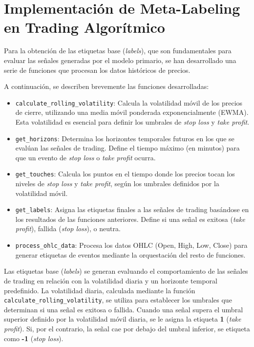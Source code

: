 \documentclass[a4paper,12pt, twoside]{report}
\begin{document}
\section{Implementación de Meta-Labeling en Trading Algorítmico}

Para la obtención de las etiquetas base (\textit{labels}), que 
son fundamentales para evaluar las señales generadas por el modelo primario, se han 
desarrollado una serie de funciones que procesan los datos históricos de precios.

A continuación, se describen brevemente las funciones desarrolladas:

\begin{itemize}
    
    \item \texttt{calculate\_rolling\_volatility}: Calcula la volatilidad móvil de 
    los precios de cierre, utilizando una media móvil ponderada exponencialmente (EWMA). 
    Esta volatilidad es esencial para definir los umbrales de \textit{stop loss} y 
    \textit{take profit}.
    
    \item \texttt{get\_horizons}: Determina los horizontes temporales futuros en 
    los que se evalúan las señales de trading. Define el tiempo máximo (en minutos) 
    para que un evento de \textit{stop loss} o \textit{take profit} ocurra.
    
    \item \texttt{get\_touches}: Calcula los puntos en el tiempo donde los precios 
    tocan los niveles de \textit{stop loss} y \textit{take profit}, según los 
    umbrales definidos por la volatilidad móvil.
    
    \item \texttt{get\_labels}: Asigna las etiquetas finales a las señales de 
    trading basándose en los resultados de las funciones anteriores. Define si 
    una señal es exitosa (\textit{take profit}), fallida (\textit{stop loss}), 
    o neutra.

    \item \texttt{process\_ohlc\_data}: Procesa los datos OHLC (Open, High, Low, 
    Close) para generar etiquetas de eventos mediante la orquestación del resto 
    de funciones.
    
\end{itemize}


Las etiquetas base (\textit{labels}) se generan evaluando el comportamiento de las 
señales de trading en relación con la volatilidad diaria y un horizonte temporal 
predefinido. La volatilidad diaria, calculada mediante la función 
\texttt{calculate\_rolling\_volatility}, se utiliza para establecer los umbrales 
que determinan si una señal es exitosa o fallida. Cuando una señal supera el 
umbral superior definido por la volatilidad móvil diaria, se le asigna la 
etiqueta \textbf{1} (\textit{take profit}). Si, por el contrario, la señal cae 
por debajo del umbral inferior, se etiqueta como \textbf{-1} (\textit{stop loss}).
\end{document}
